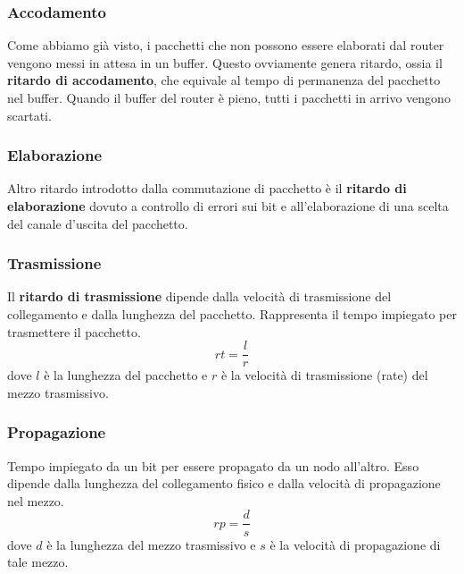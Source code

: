\subsubsection{Accodamento}
Come abbiamo già visto, i pacchetti che non possono essere elaborati dal router vengono messi in
attesa in un buffer. Questo ovviamente genera ritardo, ossia il \textbf{ritardo di accodamento},
che equivale al tempo di permanenza del pacchetto nel buffer. Quando il buffer del router è pieno,
tutti i pacchetti in arrivo vengono scartati.

\subsubsection{Elaborazione}
Altro ritardo introdotto dalla commutazione di pacchetto è il \textbf{ritardo di elaborazione}
dovuto a controllo di errori sui bit e all'elaborazione di una scelta del canale d'uscita del
pacchetto.

\subsubsection{Trasmissione}
Il \textbf{ritardo di trasmissione} dipende dalla velocità di trasmissione del collegamento e dalla
lunghezza del pacchetto. Rappresenta il tempo impiegato per trasmettere il pacchetto.
\[ rt = \frac{l}{r} \]
dove $l$ è la lunghezza del pacchetto e $r$ è la velocità di trasmissione (rate) del mezzo
trasmissivo.

\subsubsection{Propagazione}
Tempo impiegato da un bit per essere propagato da un nodo all'altro. Esso dipende dalla lunghezza
del collegamento fisico e dalla velocità di propagazione nel mezzo.
\[ rp = \frac{d}{s} \]
dove $d$ è la lunghezza del mezzo trasmissivo e $s$ è la velocità di propagazione di tale mezzo.
